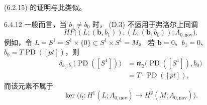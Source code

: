 (6.2.15) 的证明与此类似。

\begin{remark}{6.4.12}\label{rem:6-4-12}
一般而言，当 $b_1\ne b_0$ 时，
\textup{(D.3)} 不适用于弗洛尔上同调
\[
HF\bigl((L;(\boldsymbol b,b_1)),
(L;(\boldsymbol b,b_0));
\Lambda_{0,\mathrm{nov}}\bigr).
\]
例如，令
$L=S^1=S^1\times\{0\}
\subset S^1\times S^1=M$。
若 $\boldsymbol b=0$、$b_1=0$、
$b_0=T\operatorname{PD}([pt])$，则
\[
\begin{aligned}
\delta_{b_1,b_0}
\bigl(\operatorname{PD}([S^1])\bigr)
&=\mathfrak m_2
\bigl(\operatorname{PD}([S^1]),b_0\bigr)\\
&=T\cdot\operatorname{PD}([pt]),
\end{aligned}
\]
而该元素不属于
\[
\ker\bigl(
i_!:H^1(L;\Lambda_{0,\mathrm{nov}})
\longrightarrow H^2(M;\Lambda_{0,\mathrm{nov}})
\bigr).
\]
\end{remark}
